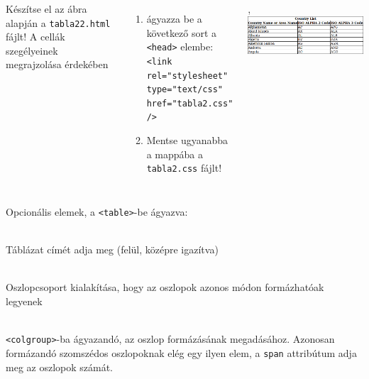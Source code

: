 \begin{frame}
  \begin{columns}[c]
      Készítse el az ábra alapján a \texttt{tabla22.html} fájlt! A cellák szegélyeinek megrajzolása érdekében 
      \begin{enumerate}
        \item ágyazza be a következő sort a \texttt{<head>} elembe:\\
          \texttt{<link rel="stylesheet" type="text/css" href="tabla2.css" />}
        \item Mentse ugyanabba a mappába a \texttt{tabla2.css} fájlt!
      \end{enumerate}
      \begin{exampleblock}{, }
        \centering \includegraphics[width=\textwidth]{tabla22.png}
      \end{exampleblock}
  \end{columns} 
\end{frame}

\begin{frame}
  Opcionális elemek, a \texttt{<table>}-be ágyazva:
  \begin{description}[m]
    \item[\texttt{<caption>}] \hfill \\ Táblázat címét adja meg (felül, középre igazítva)
    \item[\texttt{<colgroup>}] \hfill \\ Oszlopcsoport kialakítása, hogy az oszlopok azonos módon formázhatóak legyenek
    \item[\texttt{<col>}] \hfill \\ \texttt{<colgroup>}-ba ágyazandó, az oszlop formázásának megadásához. Azonosan 
      formázandó szomszédos oszlopoknak elég egy ilyen elem, a \texttt{span} attribútum adja meg az oszlopok számát.
  \end{description}
\end{frame}

